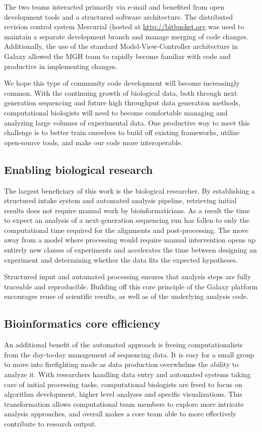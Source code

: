 \documentclass[10pt]{bmc_article}
\newenvironment{bmcformat}{\begin{raggedright}\baselineskip20pt\sloppy\setboolean{publ}{false}}{\end{raggedright}\baselineskip20pt\sloppy}
\begin{document}
\begin{bmcformat}
The two teams interacted primarily via e-mail and benefited from open
development tools and a structured software architecture. The
distributed revision control system Mercurial (hosted at
\url{http://bitbucket.org} was used to maintain a separate development
branch and manage merging of code changes. Additionally, the use of
the standard Model-View-Controller architecture in Galaxy allowed the
MGH team to rapidly become familiar with code and productive in
implementing changes.

We hope this type of community code development will become
increasingly common. With the continuing growth of biological data,
both through next generation sequencing and future high throughput
data generation methods, computational biologists will need to become
comfortable managing and analyzing large volumes of experimental
data. One productive way to meet this challenge is to better train
ourselves to build off existing frameworks, utilize open-source tools,
and make our code more interoperable.

\subsection*{Enabling biological research}

The largest beneficiary of this work is the biological
researcher. By establishing a structured intake
system and automated analysis pipeline, retrieving initial results
does not require manual work by bioinformaticians. As a result
the time to expect an analysis of a next-generation sequencing run has
fallen to only the computational time required for the alignments and
post-processing. The move away from a model where processing would
require manual intervention opens up entirely new classes of
experiments and accelerates the time between designing an experiment
and determining whether the data fits the expected hypotheses.

Structured input and automated processing ensures that analysis steps
are fully traceable and reproducible. Building off this core principle
of the Galaxy platform encourages reuse of scientific results, as well
as of the underlying analysis code.

\subsection*{Bioinformatics core efficiency}

An additional benefit of the automated approach is freeing
computationalists from the day-to-day management of
sequencing data. It is easy for a small group to move into
firefighting mode as data production overwhelms the ability to
analyze it. With researchers handling data entry and automated systems
taking care of initial processing tasks, computational biologists are
freed to focus on algorithm development, higher level analyses and
specific visualizations. This transformation allows computational team
members to explore more intricate analysis approaches, and overall
makes a core team able to more effectively contribute to research
output.


\end{bmcformat}
\end{document}
